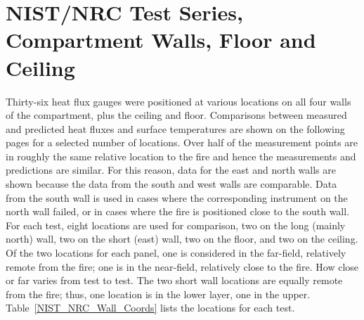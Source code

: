 \clearpage





\section{NIST/NRC Test Series, Compartment Walls, Floor and Ceiling}

Thirty-six heat flux gauges were positioned at various locations on all four walls of the compartment,
plus the ceiling and floor.  Comparisons between measured and predicted heat fluxes and surface temperatures are shown
on the following pages for a selected number of locations.
Over half of the measurement points are in roughly the same relative location to the fire and hence
the measurements and predictions are similar.  For this reason, data for the east and north walls are shown
because the data from the south and west walls are comparable.  Data from the south wall is used in cases where
the corresponding instrument on the north wall failed, or in cases where the fire is positioned close to the south wall.
For each test, eight locations are used for comparison, two on the long (mainly north) wall,
two on the short (east) wall, two on the floor, and two on the ceiling.  Of the two locations for each panel,
one is considered in the far-field, relatively remote from the fire; one is in the near-field,
relatively close to the fire.  How close or far varies from test to test.
The two short wall locations are equally remote from the fire; thus, one location is in the lower layer, one in the upper.
Table~\ref{NIST_NRC_Wall_Coords} lists the locations for each test.


\vspace{\baselineskip}

